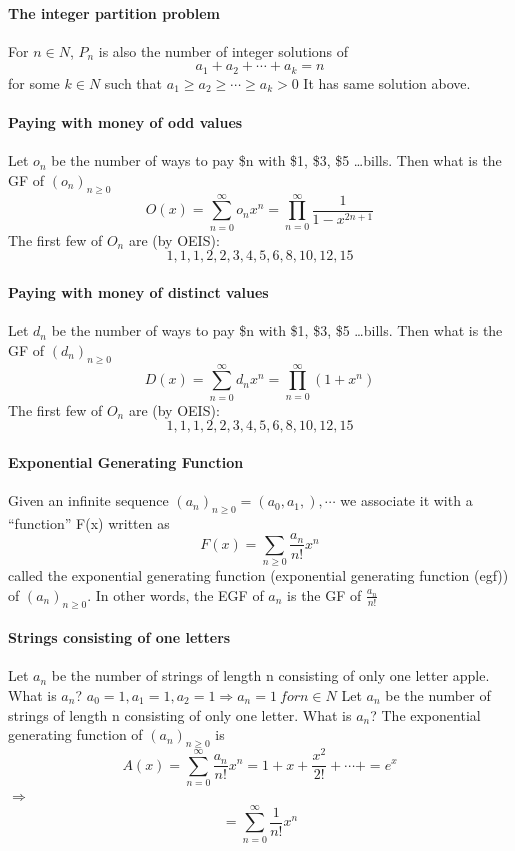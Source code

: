 \documentclass{article}
\begin{document}
\paragraph{The integer partition problem}
For $n\in N$, $P_n$
is also the number of integer solutions of
$$a_1+a_2+\cdots+a_k=n$$
for some $k\in N$ such that $a_1\ge a_2\ge \cdots \ge a_k>0$
It has same solution above.
\paragraph{Paying with money of odd values}
Let $o_n$ be the number of ways to pay \$n with \$1, \$3, \$5 …bills.\newline
Then what is the GF of $(o_n)_{n\ge 0}$
$$O(x)=\sum_{n=0}^{\infty}o_nx^n=\prod_{n=0}^{\infty}\frac{1}{1-x^{2n+1}}$$
The first few of $O_n$ are (by OEIS):
$$1, 1, 1, 2, 2, 3, 4, 5, 6, 8, 10, 12, 15$$
\paragraph{Paying with money of distinct values}
Let $d_n$ be the number of ways to pay \$n with \$1, \$3, \$5 …bills.\newline
Then what is the GF of $(d_n)_{n\ge 0}$
$$D(x)=\sum_{n=0}^{\infty}d_nx^n=\prod_{n=0}^{\infty}(1+x^n)$$
The first few of $O_n$ are (by OEIS):
$$1, 1, 1, 2, 2, 3, 4, 5, 6, 8, 10, 12, 15$$

\paragraph{Exponential Generating Function}
Given an infinite sequence $(a_n)_{n\ge 0}=(a_0,a_1,),\cdots$ we associate it
with a “function” F(x) written as $$F(x)=\sum_{n\ge 0}\frac{a_n}{n!}x^n$$
called the exponential generating function (exponential generating function (egf)) of $(a_n)_{n\ge 0}$.\newline
In other words, the EGF of $a_n$ is the GF of $\frac{a_n}{n!}$
\paragraph{Strings consisting of one letters}
Let $a_n$ be the number of strings of length n consisting of only one letter apple.\newline
What is $a_n$?\newline
$a_0=1,a_1=1,a_2=1 \Longrightarrow a_n=1 \ for n\in N$\newline
Let $a_n$ be the number of strings of length n consisting of only one letter.\newline
What is $a_n$?\newline
The exponential generating function of $(a_n)_{n\ge 0}$ is $$A(x)=\sum_{n=0}^{\infty}\frac{a_n}{n!}x^n=1+x+\frac{x^2}{2!}+\cdots +=e^x$$
$\Longrightarrow$
$$=\sum_{n=0}^{\infty}\frac{1}{n!}x^n$$
\end{document}

